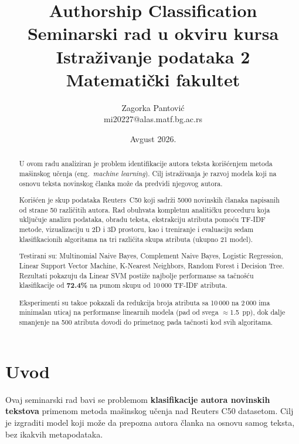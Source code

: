 \documentclass[12pt, a4paper]{article}
\title{%
  \textbf{Authorship Classification}\\[0.4cm]
  \large Seminarski rad u okviru kursa\\
  Istra\v{z}ivanje podataka 2\\
  Matemati\v{c}ki fakultet
}
\author{Zagorka Pantovi\'{c}\\[0.1cm]
  \small mi20227@alas.matf.bg.ac.rs}
\date{Avgust 2026.}
\begin{document}
\maketitle
\thispagestyle{empty}

\begin{abstract}
U ovom radu analiziran je problem identifikacije autora teksta kori\v{s}\'{c}enjem
metoda ma\v{s}inskog u\v{c}enja (eng.\ \textit{machine learning}). Cilj istra\v{z}ivanja
je razvoj modela koji na osnovu teksta novinskog \v{c}lanka mo\v{z}e da predvidi
njegovog autora.

Kori\v{s}\'{c}en je skup podataka Reuters~C50 koji sadr\v{z}i 5000 novinskih
\v{c}lanaka napisanih od strane 50 razli\v{c}itih autora. Rad obuhvata kompletnu
analiti\v{c}ku proceduru koja uklju\v{c}uje analizu podataka, obradu teksta,
ekstrakciju atributa pomo\'{c}u TF-IDF metode, vizualizaciju u 2D i 3D prostoru,
kao i treniranje i evaluaciju sedam klasifikacionih algoritama na tri razli\v{c}ita
skupa atributa (ukupno 21 model).

Testirani su: Multinomial Naive Bayes, Complement Naive Bayes, Logistic Regression,
Linear Support Vector Machine, K-Nearest Neighbors, Random Forest i Decision Tree.
Rezultati pokazuju da Linear SVM posti\v{z}e najbolje performanse sa ta\v{c}no\v{s}\'{c}u
klasifikacije od \textbf{72.4\%} na punom skupu od 10\,000 TF-IDF atributa.

Eksperimenti su tako{\dj}e pokazali da redukcija broja atributa sa 10\,000 na 2\,000
ima minimalan uticaj na performanse linearnih modela (pad od svega $\approx$1.5~pp),
dok dalje smanjenje na 500 atributa dovodi do primetnog pada ta\v{c}nosti kod svih algoritama.
\end{abstract}

\newpage
\tableofcontents
\newpage

\section{Uvod}

Ovaj seminarski rad bavi se problemom \textbf{klasifikacije autora novinskih tekstova} primenom
metoda mašinskog učenja nad Reuters C50 datasetom. Cilj je izgraditi model koji može da prepozna
autora članka na osnovu samog teksta, bez ikakvih metapodataka.
\end{document}
